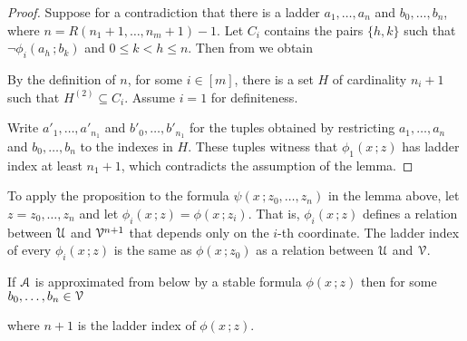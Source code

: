 \documentclass[scombinatorics.tex]{subfiles}
\begin{document}
\begin{proof} 
  Suppose for a contradiction that there is a ladder $a_1,\dots,a_n$ and $b_0,\dots,b_n$, where $n=R(n_1+1,\dots, n_m+1)-1$.
  Let $C_i$ contains the pairs $\{h,k\}$ such that $\neg\phi_i(a_h\,;b_k)$ and $0\le k<h\le n$.
  Then from  we obtain 
  
  
  By the definition of $n$, for some $i\in[m]$, there is a set $H$ of cardinality $n_i+1$ such that $H^{(2)}\subseteq C_i$.
  Assume $i{=}1$ for definiteness.

  Write $a'_1,\dots,a'_{n_1}$ and $b'_0,\dots,b'_{n_1}$ for the tuples obtained by restricting $a_1,\dots,a_n$ and $b_0,\dots,b_n$ to the indexes in $H$.
  These tuples witness that $\phi_1(x\,;z)$ has ladder index at least $n_1+1$, which contradicts the assumption of the lemma.
\end{proof}

To apply the proposition to the formula $\psi(x\,;z_0,\dots,z_n)$ in the lemma above, let $z=z_0,\dots,z_n$ and let $\phi_i(x\,;z)=\phi(x\,;z_i)$.
That is, $\phi_i(x\,;z)$ defines a relation between $\EuScript U$ and $\EuScript V^{n+1}$ that depends only on the $i$-th coordinate.
The ladder index of every $\phi_i(x\,;z)$ is the same as $\phi(x\,;z_0)$ as a relation between $\EuScript U$ and $\EuScript V$.


\begin{lemma}
  If $\EuScript A$ is approximated from below by a stable formula $\phi(x\,;z)$ then for some $b_0,\dots,b_n\in\EuScript V$ 
  \\[-1ex]
  
  where $n+1$ is the ladder index of $\phi(x\,;z)$. 
\end{lemma}
  
\end{document}
